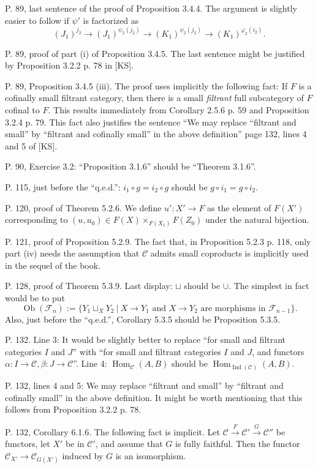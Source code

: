 \documentclass[12pt]{article}
\theoremstyle{remark}
\newcommand{\n}{\noindent}
\newcommand{\C}{\mathcal C}
\newcommand{\F}{\mathcal F}
\newcommand{\p}{\varphi}
\DeclareMathOperator{\Hom}{Hom}
\DeclareMathOperator{\Ind}{Ind}
\DeclareMathOperator{\Ob}{Ob}
\begin{document}
\n P. 89, last sentence of the proof of Proposition 3.4.4. The argument is slightly easier to follow if $\psi'$ is factorized as 
$$
(J_1)^{j_2}\to(J_1)^{\psi_2(j_2)}\to(K_1)^{\psi_2(j_2)}\to(K_1)^{\p_2(i_2)}.
$$

\n P. 89, proof of part (i) of Proposition 3.4.5. The last sentence might be justified by Proposition 3.2.2 p. 78 in [KS].

\n P. 89, Proposition 3.4.5 (iii). The proof uses implicitly the following fact: If $F$ is a cofinally small filtrant category, then there is a small \emph{filtrant} full subcategory of $F$ cofinal to $F$. This results immediately from Corollary 2.5.6 p. 59 and Proposition 3.2.4 p. 79. This fact also justifies the sentence ``We may replace ``filtrant and small'' by ``filtrant and cofinally small'' in the above definition'' page 132, lines 4 and 5 of [KS].

\n P. 90, Exercise 3.2: ``Proposition 3.1.6'' should be ``Theorem 3.1.6''.

\n P. 115, just before the ``q.e.d.'': $i_1\circ g=i_2\circ g$ should be $g\circ i_1=g\circ i_2$. 

\n P. 120, proof of Theorem 5.2.6. We define $u':X'\to F$ as the element of $F(X')$ corresponding to $(u,u_0)\in F(X)\times_{F(X_1)}F(Z_0)$ under the natural bijection. 

\n P. 121, proof of Proposition 5.2.9. The fact that, in Proposition 5.2.3 p. 118, only part (iv) needs the assumption that $\C$ admits small coproducts is implicitly used in the sequel of the book. 

\n P. 128, proof of Theorem 5.3.9. Last display: $\sqcup$ should be $\cup$. The simplest in fact would be to put 
$$
\Ob(\F_n):=\{Y_1\sqcup_XY_2\ |\ X\to Y_1\text{ and }X\to Y_2\text{ are morphisms in }\F_{n-1}\}.
$$
Also, just before the ``q.e.d.'', Corollary 5.3.5 should be Proposition 5.3.5. 

\n P. 132. Line 3: It would be slightly better to replace ``for small and filtrant categories $I$ and $J$'' with ``for small and filtrant categories $I$ and $J$, and functors $\alpha:I\to\C,\beta:J\to\C$''. Line 4: $\Hom_\C(A,B)$ should be $\Hom_{\Ind(\C)}(A,B)$. 

\n P. 132, lines 4 and 5: \guillemotleft We may replace ``filtrant and small'' by ``filtrant and cofinally small'' in the above definition\guillemotright. It might be worth mentioning that this follows from Proposition 3.2.2 p. 78. 

\n P. 132, Corollary 6.1.6. The following fact is implicit. Let $\C\xrightarrow{F}\C'\xrightarrow{G}\C''$ be functors, let $X'$ be in $\C'$, and assume that $G$ is fully faithful. Then the functor $\C_{X'}\to\C_{G(X')}$ induced by $G$ is an isomorphism. 
\end{document}
